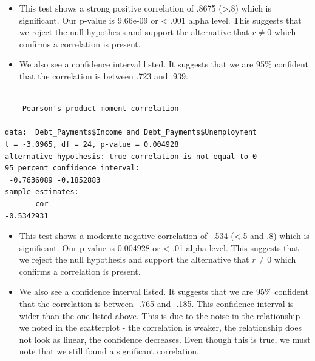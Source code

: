 \documentclass[
  letterpaper,
  DIV=11,
  numbers=noendperiod]{scrreprt}
\newenvironment{Shaded}{\begin{snugshade}}{\end{snugshade}}
\newcommand{\FunctionTok}[1]{\textcolor[rgb]{0.28,0.35,0.67}{#1}}
\newcommand{\NormalTok}[1]{\textcolor[rgb]{0.00,0.23,0.31}{#1}}
\newcommand{\SpecialCharTok}[1]{\textcolor[rgb]{0.37,0.37,0.37}{#1}}
\providecommand{\tightlist}{%
  \setlength{\itemsep}{0pt}\setlength{\parskip}{0pt}}\usepackage{longtable,booktabs,array}
\begin{document}
\begin{itemize}
\tightlist
\item
  This test shows a strong positive correlation of .8675
  (\textgreater.8) which is significant. Our p-value is 9.66e-09 or
  \textless{} .001 alpha level. This suggests that we reject the null
  hypothesis and support the alternative that \(r \neq 0\) which
  confirms a correlation is present.
\item
  We also see a confidence interval listed. It suggests that we are 95\%
  confident that the correlation is between .723 and .939.
\end{itemize}

\begin{Shaded}
\end{Shaded}

\begin{verbatim}

    Pearson's product-moment correlation

data:  Debt_Payments$Income and Debt_Payments$Unemployment
t = -3.0965, df = 24, p-value = 0.004928
alternative hypothesis: true correlation is not equal to 0
95 percent confidence interval:
 -0.7636089 -0.1852883
sample estimates:
       cor 
-0.5342931 
\end{verbatim}

\begin{itemize}
\tightlist
\item
  This test shows a moderate negative correlation of -.534 (\textless.5
  and .8) which is significant. Our p-value is 0.004928 or \textless{}
  .01 alpha level. This suggests that we reject the null hypothesis and
  support the alternative that \(r \neq 0\) which confirms a correlation
  is present.
\item
  We also see a confidence interval listed. It suggests that we are 95\%
  confident that the correlation is between -.765 and -.185. This
  confidence interval is wider than the one listed above. This is due to
  the noise in the relationship we noted in the scatterplot - the
  correlation is weaker, the relationship does not look as linear, the
  confidence decreases. Even though this is true, we must note that we
  still found a significant correlation.
\end{itemize}
\end{document}
